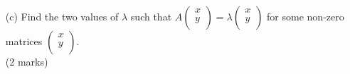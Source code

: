 \documentclass{report}
\begin{document}
\begin{enumerate}
\begin{enumerate}
		\begin{enumerate}
			\item [(i)]Prove that $\begin{vmatrix}
				p - \lambda_1 & q \\ 
				r & s - \lambda_1   \notag
				\end{vmatrix} = 0$ and $\begin{vmatrix}
				p - \lambda_2 & q \\ 
				r & s - \lambda_2   \notag
				\end{vmatrix} = 0$. 
			\item [(ii)]Prove that $\lambda_1$ and $\lambda_2$ are the roots of the equation $$\lambda^2 - \text{tr}(C) \cdot \lambda + |C| = 0.$$
		\end{enumerate}
		(5 marks)
		\item [(c)]Find the two values of $\lambda$ such that $A\begin{pmatrix}
			x\\y\\
		\end{pmatrix} = \lambda \begin{pmatrix}
			x\\y\\
		\end{pmatrix}$ for some non-zero matrices $\begin{pmatrix}
			x\\y\\
		\end{pmatrix}$. \\(2 marks)
	\end{enumerate}


\end{enumerate}
\end{document}
